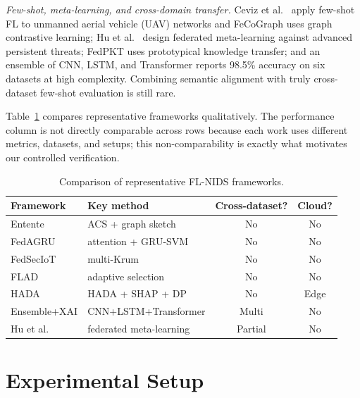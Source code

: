 \documentclass[conference]{IEEEtran}
\begin{document}
\textit{Few-shot, meta-learning, and cross-domain transfer.} Ceviz et al.\ \cite{b10}
apply few-shot FL to unmanned aerial vehicle (UAV) networks and FeCoGraph \cite{b28} uses graph contrastive
learning; Hu et al.\ \cite{b9} design federated meta-learning against advanced
persistent threats; FedPKT \cite{b29} uses prototypical knowledge transfer; and an
ensemble of CNN, LSTM, and Transformer \cite{b30} reports 98.5\% accuracy on six
datasets at high complexity. Combining semantic alignment with truly cross-dataset
few-shot evaluation is still rare.

Table~\ref{tab:sota} compares representative frameworks qualitatively. The performance
column is not directly comparable across rows because each work uses different
metrics, datasets, and setups; this non-comparability is exactly what motivates our
controlled verification.

\begin{table}[htbp]
\caption{Comparison of representative FL-NIDS frameworks.}
\label{tab:sota}
\begin{center}
\footnotesize
\begin{tabular}{|l|l|c|c|}
\hline
\textbf{Framework} & \textbf{Key method} & \textbf{Cross-dataset?} & \textbf{Cloud?} \\
\hline
Entente \cite{b11} & ACS + graph sketch & No & No \\
FedAGRU \cite{b12} & attention + GRU-SVM & No & No \\
FedSecIoT \cite{b23} & multi-Krum & No & No \\
FLAD \cite{b14} & adaptive selection & No & No \\
HADA \cite{b22} & HADA + SHAP + DP & No & Edge \\
Ensemble+XAI \cite{b30} & CNN+LSTM+Transformer & Multi & No \\
Hu et al.\ \cite{b9} & federated meta-learning & Partial & No \\
\hline
\end{tabular}
\end{center}
\end{table}

\section{Experimental Setup}
\label{sec:setup}
\end{document}
